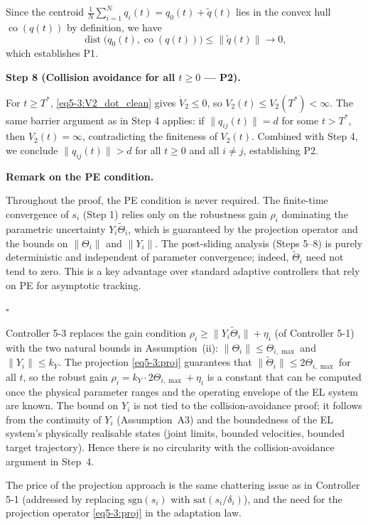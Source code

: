 Since the centroid $\frac1N\sum_{i=1}^N q_i(t) = q_0(t) + \tilde{q}(t)$ lies in the convex hull
$\operatorname{co}(q(t))$ by definition, we have
\begin{equation}
	\operatorname{dist}\bigl(q_0(t), \operatorname{co}(q(t))\bigr)
	\le \|\tilde{q}(t)\| \to 0,
\end{equation}
which establishes P1.

\medskip\noindent\textbf{Step 8 (Collision avoidance for all $t \ge 0$ --- P2).}

For $t \ge T^*$, \eqref{eq5-3:V2_dot_clean} gives $\dot{V}_2 \le 0$, so
$V_2(t) \le V_2(T^*) < \infty$.  The same barrier argument as in Step 4 applies:
if $\|q_{ij}(t)\| = d$ for some $t > T^*$, then $V_2(t) = \infty$, contradicting the
finiteness of $V_2(t)$.  Combined with Step 4, we conclude $\|q_{ij}(t)\| > d$ for all
$t \ge 0$ and all $i \neq j$, establishing P2.

\medskip\noindent\textbf{Remark on the PE condition.}

Throughout the proof, the PE condition is never required.  The finite-time convergence of
$s_i$ (Step 1) relies only on the robustness gain $\rho_i$ dominating the parametric
uncertainty $Y_i\tilde{\Theta}_i$, which is guaranteed by the projection operator and the
bounds on $\|\Theta_i\|$ and $\|Y_i\|$.  The post-sliding analysis (Steps 5--8) is purely
deterministic and independent of parameter convergence; indeed, $\tilde{\Theta}_i$ need not
tend to zero.  This is a key advantage over standard adaptive controllers that rely on PE
for asymptotic tracking.

\hfill$\square$

\begin{remark}
	Controller 5-3 replaces the gain condition $\rho_i \ge \|Y_i\tilde{\Theta}_i\| + \eta_i$
	(of Controller 5-1) with the two natural bounds in Assumption~(ii):
	$\|\Theta_i\| \le \Theta_{i,\max}$ and $\|Y_i\| \le k_Y$. The projection
	\eqref{eq5-3:proj} guarantees that $\|\tilde{\Theta}_i\| \le 2\Theta_{i,\max}$
	for all $t$, so the robust gain $\rho_i = k_Y \cdot 2\Theta_{i,\max} + \eta_i$ is a
	constant that can be computed once the physical parameter ranges and the operating
	envelope of the EL system are known.  The bound on $Y_i$ is not tied to the
	collision-avoidance proof; it follows from the continuity of $Y_i$ (Assumption~A3)
	and the boundedness of the EL system's physically realisable states (joint limits,
	bounded velocities, bounded target trajectory).  Hence there is no circularity with
	the collision-avoidance argument in Step~4.

	The price of the projection approach is the same chattering issue as in Controller
	5-1 (addressed by replacing $\mathrm{sgn}(s_i)$ with $\mathrm{sat}(s_i/\delta_i)$),
	and the need for the projection operator \eqref{eq5-3:proj} in the adaptation law.
\end{remark}